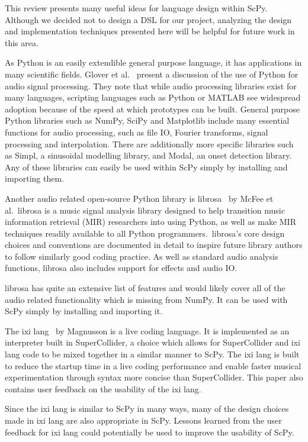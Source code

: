 \documentclass{article}
\begin{document}
This review presents many useful ideas for language design within ScPy. Although we decided not to
design a DSL for our project, analyzing the design and implementation techniques presented here
will be helpful for future work in this area.

As Python is an easily extendible general purpose language, it has applications in many scientific
fields. Glover et al.~\cite{glover2011python} present a discussion of the use of Python for audio
signal processing. They note that while audio processing libraries exist for many languages,
scripting languages such as Python or MATLAB see widespread adoption because of the speed at which
prototypes can be built. General purpose Python libraries such as NumPy, SciPy and Matplotlib
include many essential functions for audio processing, such as file IO, Fourier transforms, signal
processing and interpolation. There are additionally more specific libraries such as Simpl, a
sinusoidal modelling library, and Modal, an onset detection library. Any of these libraries can
easily be used within ScPy simply by installing and importing them.

Another audio related open-source Python library is librosa~\cite{mcfee2015librosa} by McFee et
al.\ librosa is a music signal analysis library designed to help transition music information
retrieval (MIR) researchers into using Python, as well as make MIR techniques readily available to
all Python programmers.\ librosa's core design choices and conventions are documented in detail to
inspire future library authors to follow similarly good coding practice. As well as standard audio
analysis functions, librosa also includes support for effects and audio IO.\@

librosa has quite an extensive list of features and would likely cover all of the audio related
functionality which is missing from NumPy. It can be used with ScPy simply by installing and importing
it.

The ixi lang~\cite{magnusson2011ixi} by Magnusson is a live coding language. It is implemented as an interpreter
built in SuperCollider, a choice which allows for SuperCollider and ixi lang code to be mixed
together in a similar manner to ScPy. The ixi lang is built to reduce the startup time in a live
coding performance and enable faster musical experimentation through syntax more concise than
SuperCollider. This paper also contains user feedback on the usability of the ixi lang.

Since the ixi lang is similar to ScPy in many ways, many of the design choices made in ixi lang are
also appropriate in ScPy. Lessons learned from the user feedback for ixi lang could
potentially be used to improve the usability of ScPy.
\end{document}
